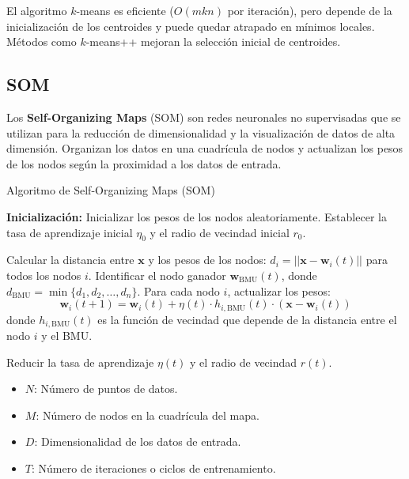 \documentclass[titlepage,a4paper]{article}
\begin{document}
El algoritmo \( k \)-means es eficiente (\( O(m k n) \) por iteración), pero depende de la inicialización de los centroides y puede quedar atrapado en mínimos locales. Métodos como \( k \)-means++ mejoran la selección inicial de centroides.

\subsection{SOM}
Los \textbf{Self-Organizing Maps} (SOM) son redes neuronales no supervisadas que se utilizan para la reducción de dimensionalidad y la visualización de datos de alta dimensión. Organizan los datos en una cuadrícula de nodos y actualizan los pesos de los nodos según la proximidad a los datos de entrada.

\begin{algorithm}
\caption{Algoritmo de Self-Organizing Maps (SOM)}
\begin{algorithmic}[1]
\State \textbf{Inicialización:}
\State \quad Inicializar los pesos de los nodos aleatoriamente.
\State \quad Establecer la tasa de aprendizaje inicial $\eta_0$ y el radio de vecindad inicial $r_0$.

        \State Calcular la distancia entre $\mathbf{x}$ y los pesos de los nodos: $d_i = || \mathbf{x} - \mathbf{w}_i(t) ||$ para todos los nodos $i$.
        \State Identificar el nodo ganador $\mathbf{w}_\text{BMU}(t)$, donde $d_\text{BMU} = \min \{ d_1, d_2, \dots, d_n \}$.
        \State Para cada nodo $i$, actualizar los pesos:
        \[
        \mathbf{w}_i(t+1) = \mathbf{w}_i(t) + \eta(t) \cdot h_{i, \text{BMU}}(t) \cdot (\mathbf{x} - \mathbf{w}_i(t))
        \]
        donde $h_{i, \text{BMU}}(t)$ es la función de vecindad que depende de la distancia entre el nodo $i$ y el BMU.

    \EndFor
    \State Reducir la tasa de aprendizaje $\eta(t)$ y el radio de vecindad $r(t)$.
\EndFor
\end{algorithmic}
\end{algorithm}

\begin{itemize}
    \item \( N \): Número de puntos de datos.
    \item \( M \): Número de nodos en la cuadrícula del mapa.
    \item \( D \): Dimensionalidad de los datos de entrada.
    \item \( T \): Número de iteraciones o ciclos de entrenamiento.
\end{itemize}
\end{document}
